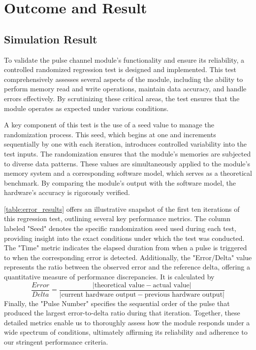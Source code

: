 \chapter{Outcome and Result}

\section{Simulation Result}

To validate the pulse channel module's functionality and ensure its reliability, a controlled randomized regression test is designed and implemented. This test comprehensively assesses several aspects of the module, including the ability to perform memory read and write operations, maintain data accuracy, and handle errors effectively. By scrutinizing these critical areas, the test ensures that the module operates as expected under various conditions.

A key component of this test is the use of a seed value to manage the randomization process. This seed, which begins at one and increments sequentially by one with each iteration, introduces controlled variability into the test inputs. The randomization ensures that the module's memories are subjected to diverse data patterns. These values are simultaneously applied to the module's memory system and a corresponding software model, which serves as a theoretical benchmark. By comparing the module's output with the software model, the hardware's accuracy is rigorously verified.

\autoref{table:error_results} offers an illustrative snapshot of the first ten iterations of this regression test, outlining several key performance metrics. The column labeled "Seed" denotes the specific randomization seed used during each test, providing insight into the exact conditions under which the test was conducted. The "Time" metric indicates the elapsed duration from when a pulse is triggered to when the corresponding error is detected. Additionally, the "Error/Delta" value represents the ratio between the observed error and the reference delta, offering a quantitative measure of performance discrepancies. It is calculated by
\begin{equation}
\frac{Error}{Delta} = \frac{|\text{theoretical value} - \text{actual value}|}{|\text{current hardware output} - \text{previous hardware output}|}
\end{equation}
Finally, the "Pulse Number" specifies the sequential order of the pulse that produced the largest error-to-delta ratio during that iteration. Together, these detailed metrics enable us to thoroughly assess how the module responds under a wide spectrum of conditions, ultimately affirming its reliability and adherence to our stringent performance criteria.


